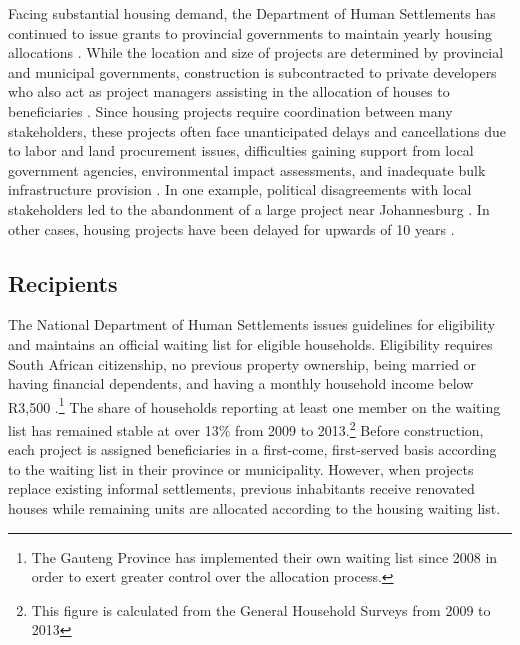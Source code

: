 \documentclass[12pt]{article}
\begin{document}
Facing substantial housing demand, the Department of Human Settlements has continued to issue grants to provincial governments to maintain yearly housing allocations \citep{dhsreports}.  While the location and size of projects are determined by provincial and municipal governments, construction is subcontracted to private developers who also act as project managers assisting in the allocation of houses to beneficiaries \citep{seriq}. Since housing projects require coordination between many stakeholders, these pro\-jects often face unanticipated delays and cancellations due to labor and land procurement issues, difficulties gaining support from local government agencies, environmental impact assessments, and inadequate bulk infrastructure provision \citep{dhsreports}.  In one example, political disagreements with local stakeholders led to the abandonment of a large project near Johannesburg \citep{protest}.  In other cases, housing projects have been delayed for upwards of 10 years \citep{dagpl}. 


\subsection{Recipients}

The National Department of Human Settlements issues guidelines for eligibility and maintains an official waiting list for eligible households.  Eligibility requires South African citizenship, no previous property ownership, being married or having financial dependents, and having a monthly household income below R3,500 \citep{seriq}.\footnote{The Gauteng Province has implemented their own waiting list since 2008 in order to exert greater control over the allocation process.}  The share of households reporting at least one member on the waiting list has remained stable at over 13\% from 2009 to 2013.\footnote{\label{GHSnote}This figure is calculated from the General Household Surveys from 2009 to 2013}  Before construction, each project is assigned beneficiaries in a first-come, first-served basis according to the waiting list in their province or municipality. However, when projects replace existing informal settlements, previous inhabitants receive renovated houses while remaining units are allocated according to the housing waiting list.
\end{document}
